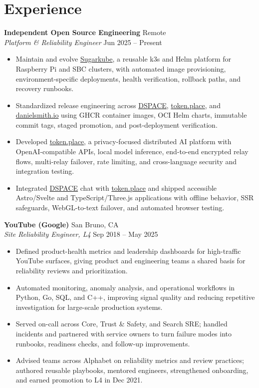 \documentclass[10pt]{article}
\begin{document}
\section*{Experience}
\textbf{Independent Open Source Engineering} \hfill Remote \\
\textit{Platform \& Reliability Engineer} \hfill Jun 2025 -- Present
\begin{itemize}
  \item Maintain and evolve
  \href{https://github.com/futuroptimist/sugarkube}{Sugarkube}, a reusable k3s and Helm platform for
  Raspberry Pi and SBC clusters, with automated image provisioning,
  environment-specific deployments, health verification, rollback paths, and recovery runbooks.
  \item Standardized release engineering across \href{https://democratized.space}{DSPACE},
  \href{https://token.place}{token.place}, and \href{https://danielsmith.io}{danielsmith.io} using
  GHCR container images, OCI Helm charts, immutable commit tags, staged promotion, and
  post-deployment verification.
  \item Developed \href{https://token.place}{token.place}, a privacy-focused distributed AI platform
  with OpenAI-compatible APIs, local model inference, end-to-end encrypted relay flows,
  multi-relay failover, rate limiting, and cross-language security and integration testing.
  \item Integrated \href{https://democratized.space}{DSPACE} chat with
  \href{https://token.place}{token.place} and shipped accessible Astro/Svelte and
  TypeScript/Three.js applications with offline behavior, SSR safeguards, WebGL-to-text failover,
  and automated browser testing.
\end{itemize}

\textbf{YouTube (Google)} \hfill San Bruno, CA \\
\textit{Site Reliability Engineer, L4} \hfill Sep 2018 -- May 2025
\begin{itemize}
  \item Defined product-health metrics and leadership dashboards for high-traffic YouTube surfaces,
  giving product and engineering teams a shared basis for reliability reviews and prioritization.
  \item Automated monitoring, anomaly analysis, and operational workflows in Python, Go, SQL, and
  C++, improving signal quality and reducing repetitive investigation for large-scale production
  systems.
  \item Served on-call across Core, Trust \& Safety, and Search SRE; handled incidents and partnered
  with service owners to turn failure modes into runbooks, readiness checks, and follow-up
  improvements.
  \item Advised teams across Alphabet on reliability metrics and review practices; authored reusable
  playbooks, mentored engineers, strengthened onboarding, and earned promotion to L4 in Dec 2021.
\end{itemize}
\end{document}
